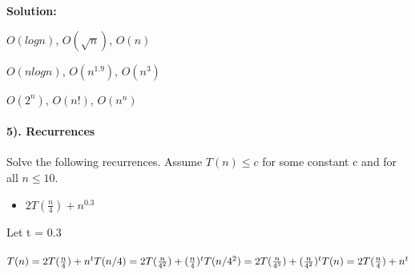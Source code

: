 \documentclass{article}
\begin{document}
\textbf{Solution:} \begin{center}
	\begin{math}O(log n)\end{math}, 
	\begin{math}O(\sqrt{n})\end{math}, 
	\begin{math}O(n)\end{math}
	
	\begin{math}O(n log n)\end{math}, 
	\begin{math}O(n^{1.9})\end{math}, 
	\begin{math}O(n^{3})\end{math}
	
	\begin{math}O(2^{n})\end{math}, 
	\begin{math}O(n!)\end{math}, 
	\begin{math}O(n^{n})\end{math}\end{center}



\paragraph{5). Recurrences}
Solve the following recurrences. Assume \begin{math}
T(n) \leq c
\end{math} 
for some constant c and for all 
\begin{math}
n \leq 10.
\end{math}
\begin{itemize}
	\item
	\begin{math}2T(\frac{n}{4}) + n^{0.3}\end{math}
\end{itemize}
Let t = 0.3\\\\
\begin{math}
	T(n) = 2T(\frac{n}{4}) + n^{t}\\\\
	T(n/4) = 2T(\frac{n}{4^{2}}) + (\frac{n}{4})^{t}\\\\
	T(n/4^{2}) = 2T(\frac{n}{4^{3}}) + ({\frac{n}{4^2}}) ^{t}\\\\
	T(n) = 2T(\frac{n}{4}) + n^{t} \end{math}
\end{document}
